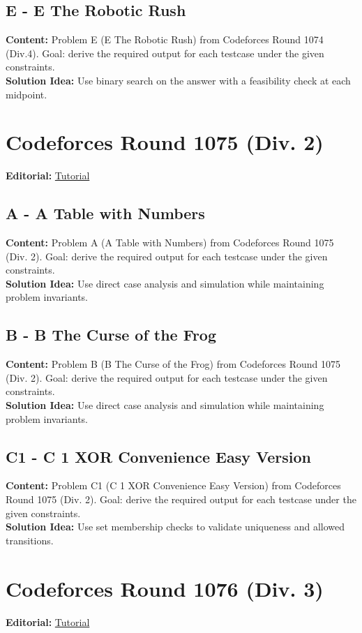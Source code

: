 \documentclass[11pt]{article}
\begin{document}
\subsection{E - E The Robotic Rush}
\textbf{Content:} Problem E (E The Robotic Rush) from Codeforces Round 1074 (Div.4). Goal: derive the required output for each testcase under the given constraints.\\
\textbf{Solution Idea:} Use binary search on the answer with a feasibility check at each midpoint.

\section{Codeforces Round 1075 (Div. 2)}
\textbf{Editorial:} \href{https://codeforces.com/blog/entry/150452}{Tutorial}

\subsection{A - A Table with Numbers}
\textbf{Content:} Problem A (A Table with Numbers) from Codeforces Round 1075 (Div. 2). Goal: derive the required output for each testcase under the given constraints.\\
\textbf{Solution Idea:} Use direct case analysis and simulation while maintaining problem invariants.

\subsection{B - B The Curse of the Frog}
\textbf{Content:} Problem B (B The Curse of the Frog) from Codeforces Round 1075 (Div. 2). Goal: derive the required output for each testcase under the given constraints.\\
\textbf{Solution Idea:} Use direct case analysis and simulation while maintaining problem invariants.

\subsection{C1 - C 1 XOR Convenience Easy Version}
\textbf{Content:} Problem C1 (C 1 XOR Convenience Easy Version) from Codeforces Round 1075 (Div. 2). Goal: derive the required output for each testcase under the given constraints.\\
\textbf{Solution Idea:} Use set membership checks to validate uniqueness and allowed transitions.

\section{Codeforces Round 1076 (Div. 3)}
\textbf{Editorial:} \href{https://codeforces.com/blog/entry/150510}{Tutorial}
\end{document}
